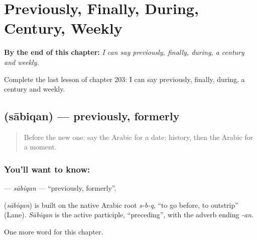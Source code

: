 
\chapter{Previously, Finally, During, Century, Weekly}
\label{ch:ar-previously-finally-during-century-weekly}

\begin{chapteropening}
\textbf{By the end of this chapter:} \emph{I can say previously, finally, during, a century and weekly.}

Complete the last lesson of chapter 203: I can say previously, finally, during, a century and weekly.
\end{chapteropening}

\section[\texorpdfstring{\ar{سابقا} (sābiqan)}{سابقا (sābiqan)}]{ (sābiqan) — previously, formerly}

\label{lesson:AR-C203-sabiqan}



\begin{quote}
Before the new one: say the Arabic for a date; history, then the Arabic for a moment.
\end{quote}

\subsection*{You'll want to know: }
\textbf{} — \emph{sābiqan} — \textquotedblleft{}previously, formerly\textquotedblright{}.

\begin{cousinweb}
\textbf{} (\emph{sābiqan}) is built on the native Arabic root \emph{s-b-q}, \textquotedblleft{}to go before, to outstrip\textquotedblright{} (Lane). \emph{Sābiqan} is the active participle, \textquotedblleft{}preceding\textquotedblright{}, with the adverb ending \emph{-an}.
\end{cousinweb}

\begin{grammarlens}[title={What you've built}]
One more word for this chapter.
\end{grammarlens}

